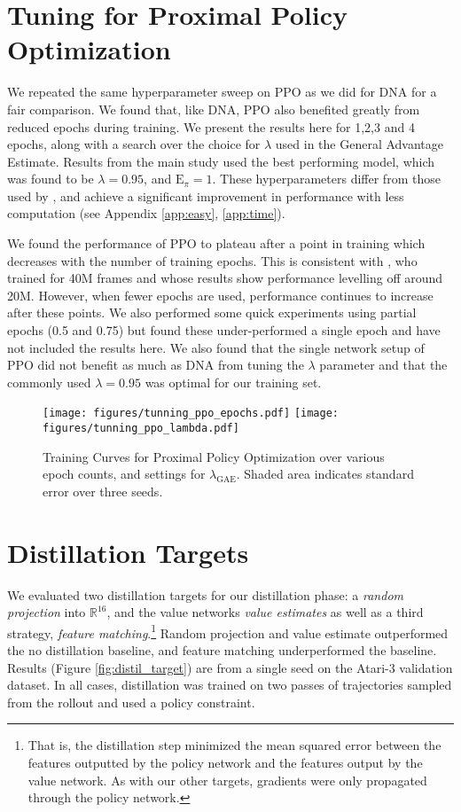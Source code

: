 \documentclass{article}
\begin{document}
\section{Tuning for Proximal Policy Optimization}
\label{app:PPO_tuning}

We repeated the same hyperparameter sweep on PPO as we did for DNA for a fair comparison. We found that, like DNA, PPO also benefited greatly from reduced epochs during training. We present the results here for 1,2,3 and 4 epochs, along with a search over the choice for $\lambda$ used in the General Advantage Estimate. Results from the main study used the best performing model, which was found to be $\lambda=0.95$, and $\text{E}_\pi=1$. These hyperparameters differ from those used by \cite{schulman2017proximal}, and achieve a significant improvement in performance with less computation (see Appendix \ref{app:easy}, \ref{app:time}). 

We found the performance of PPO to plateau after a point in training which decreases with the number of training epochs. This is consistent with \cite{schulman2017proximal}, who trained for 40M frames and whose results show performance levelling off around 20M. However, when fewer epochs are used, performance continues to increase after these points. We also performed some quick experiments using partial epochs (0.5 and 0.75) but found these under-performed a single epoch and have not included the results here. We also found that the single network setup of PPO did not benefit as much as DNA from tuning the $\lambda$ parameter and that the commonly used $\lambda=0.95$ was optimal for our training set.

\begin{figure}[!h]
    \centering
    \texttt{[image: figures/tunning\_ppo\_epochs.pdf]}
    \texttt{[image: figures/tunning\_ppo\_lambda.pdf]}
    \caption{Training Curves for Proximal Policy Optimization over various epoch counts, and settings for $\lambda_\text{GAE}$. Shaded area indicates standard error over three seeds.}
    \label{fig:ppo_hps}
\end{figure}

\section{Distillation Targets}
\label{app:distil_targets}

We evaluated two distillation targets for our distillation phase: a \textit{random projection} into $\mathbb{R}^{16}$, and the value networks \textit{value estimates} as well as a third strategy, \textit{feature matching}.\footnote{That is, the distillation step minimized the mean squared error between the features outputted by the policy network and the features output by the value network. As with our other targets, gradients were only propagated through the policy network.} Random projection and value estimate outperformed the no distillation baseline, and feature matching underperformed the baseline. Results (Figure \ref{fig:distil_target}) are from a single seed on the Atari-3 validation dataset. In all cases, distillation was trained on two passes of trajectories sampled from the rollout and used a policy constraint.
\end{document}
